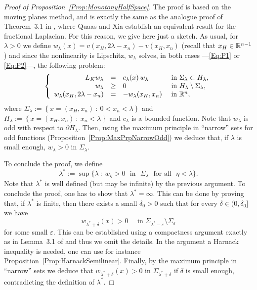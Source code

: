 \begin{proof}[Proof of Proposition~\ref{Prop:MonotonyHalfSpace}]
	The proof is based on the moving planes method, and is exactly the same as the analogue proof of Theorem~3.1 in \cite{QuaasXia}, where Quaas and Xia establish an equivalent result for the fractional Laplacian. For this reason, we give here just a sketch. As usual, for $\lambda > 0$ we define $w_\lambda (x) = v(x_H,2\lambda - x_n)-v(x_H,x_n)$ (recall that $x_H\in \mathbb{R}^{n-1}$) and since the nonlinearity is Lipschitz, $w_\lambda$ solves, in both cases ---\eqref{Eq:P1} or \eqref{Eq:P2}---, the following problem:
	$$
	\left\{\begin{array}{rcll} 
	L_K  w_\lambda &=& c_\lambda(x)\,w_\lambda  &\textrm{ in } \Sigma_\lambda\subset H_\lambda,\\ 
	w_\lambda &\geq& 0 &\textrm{ in } H_\lambda\setminus\Sigma_\lambda,\\ 
	w_\lambda(x_H,2\lambda - x_n) &=& - w_\lambda(x_H,x_n)  &\textrm{ in } \mathbb{R}^n, 
	\end{array} \right. 
	$$
	where $\Sigma_\lambda := \left\{ x = (x_H,x_n) \ : \ 0<x_n<\lambda \right\}$ and $H_\lambda := \left\{ x = (x_H,x_n) \ : \ x_n<\lambda \right\}$ and $c_\lambda$ is a bounded function. Note that $w_\lambda$ is odd with respect to $\partial H_\lambda$. Then, using the maximum principle in ``narrow'' sets for odd functions (Proposition~\ref{Prop:MaxPrpNarrowOdd}) we deduce that, if $\lambda$ is small enough, $w_\lambda>0$ in $\Sigma_\lambda$. 
	
	To conclude the proof, we define
	$$
	\lambda^* := \sup\{\lambda \ : \ w_\eta>0 \,\, \text{ in } \,\, \Sigma_\lambda \,\, \text{ for all } \,\, \eta<\lambda\}.
	$$
	Note that $\lambda^*$ is well defined (but may be infinite) by the previous argument. To conclude the proof, one has to show that $\lambda^*=\infty$. This can be done by proving that, if $\lambda^*$ is finite, then there exists a small $\delta_0 > 0$ such that for every $\delta \in (0,\delta_0]$ we have
	$$
	w_{\lambda^* +  \delta} (x) > 0 \quad \text{ in } \Sigma_{\lambda^*-\varepsilon}\setminus \Sigma_{\varepsilon}
	$$
	for some small $\varepsilon$. This can be established using a compactness argument exactly as in Lemma~3.1 of \cite{QuaasXia} and thus we omit the details. In the argument a Harnack inequality is needed, one can use for instance Proposition~\ref{Prop:HarnackSemilinear}. Finally, by the maximum principle in ``narrow'' sets we deduce that $w_{\lambda^* +  \delta} (x) > 0 $ in $\Sigma_{\lambda^*+\delta}$ if $\delta$ is small enough, contradicting the definition of $\lambda^*$.
\end{proof}


